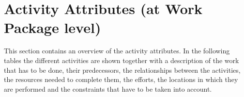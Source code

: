 \chapter{Activity Attributes (at Work Package level)}
This section contains an overview of the activity attributes. In the following tables the different activities are shown together with a description of the work that has to be done, their predecessors, the relationships between the activities, the resources needed to complete them, the efforts, the locations in which they are performed and the constraints that have to be taken into account.







